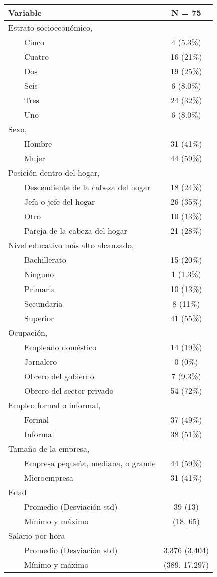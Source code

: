 \begin{longtable}{lc}
\toprule
\textbf{Variable} & \textbf{N = 75} \\ 
\midrule
Estrato socioeconómico,  &  \\ 
    Cinco & 4  (5.3\%) \\ 
    Cuatro & 16  (21\%) \\ 
    Dos & 19  (25\%) \\ 
    Seis & 6  (8.0\%) \\ 
    Tres & 24  (32\%) \\ 
    Uno & 6  (8.0\%) \\ 
Sexo,  &  \\ 
    Hombre & 31  (41\%) \\ 
    Mujer & 44  (59\%) \\ 
Posición dentro del hogar,  &  \\ 
    Descendiente de la cabeza del hogar & 18  (24\%) \\ 
    Jefa o jefe del hogar & 26  (35\%) \\ 
    Otro & 10  (13\%) \\ 
    Pareja de la cabeza del hogar & 21  (28\%) \\ 
Nivel educativo más alto alcanzado,  &  \\ 
    Bachillerato & 15  (20\%) \\ 
    Ninguno & 1  (1.3\%) \\ 
    Primaria & 10  (13\%) \\ 
    Secundaria & 8  (11\%) \\ 
    Superior & 41  (55\%) \\ 
Ocupación,  &  \\ 
    Empleado doméstico & 14  (19\%) \\ 
    Jornalero & 0  (0\%) \\ 
    Obrero del gobierno & 7  (9.3\%) \\ 
    Obrero del sector privado & 54  (72\%) \\ 
Empleo formal o informal,  &  \\ 
    Formal & 37  (49\%) \\ 
    Informal & 38  (51\%) \\ 
Tamaño de la empresa,  &  \\ 
    Empresa pequeña, mediana, o grande & 44  (59\%) \\ 
    Microempresa & 31  (41\%) \\ 
Edad &  \\ 
    Promedio (Desviación std) & 39 (13) \\ 
    Mínimo y máximo & (18, 65) \\ 
Salario por hora &  \\ 
    Promedio (Desviación std) & 3,376 (3,404) \\ 
    Mínimo y máximo & (389, 17,297) \\ 
\bottomrule
\end{longtable}


